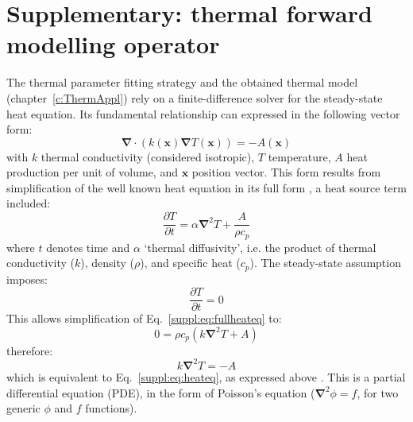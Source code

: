 \chapter{Supplementary: thermal forward modelling operator}
\label{c:ThermModel}

The thermal parameter fitting strategy and the obtained thermal model (chapter~\ref{c:ThermAppl}) rely on a finite-difference solver for the steady-state heat equation.
Its fundamental relationship can expressed in the following vector form:
\begin{equation}
    \label{suppl:eq:heateq}
    \bm{\nabla} \cdot ( k(\bm{x}) \bm{\nabla} T(\bm{x}) ) = - A(\bm{x})
\end{equation}
with $k$ thermal conductivity (considered isotropic), $T$ temperature, $A$ heat production per unit of volume, and $\bm{x}$ position vector.
This form results from simplification of the well known heat equation in its full form \parencites{Fourier1822,Carslaw1959}, a heat source term included:
\begin{equation}
    \label{suppl:eq:fullheateq}
    \frac{\partial T}{\partial t} = \alpha \bm{\nabla}^2 T + \frac{A}{\rho c_p}
\end{equation}
where $t$ denotes time and $\alpha$ `thermal diffusivity', i.e. the product of thermal conductivity ($k$), density ($\rho$), and specific heat ($c_p$).
The steady-state assumption imposes:
\begin{equation}
    \label{suppl:eq:steadystate}
    \frac{\partial T}{\partial t} = 0
\end{equation}
This allows simplification of Eq.~\ref{suppl:eq:fullheateq} to:
\begin{equation}
    \label{suppl:eq:steadystatefullheateq}
    0 = \rho c_p \left( k \bm{\nabla}^2 T + A \right)
\end{equation}
therefore:
\begin{equation}
    \label{suppl:eq:steadystatefullheateq_simplified}
    k \bm{\nabla}^2 T = - A
\end{equation}
which is equivalent to Eq.~\ref{suppl:eq:heateq}, as expressed above \parencite[e.g. ][, chapter 3]{stuwe2007geodynamics}.
This is a partial differential equation (PDE), in the form of Poisson's equation ($\bm{\nabla}^2 \phi = f$, for two generic $\phi$ and $f$ functions).

